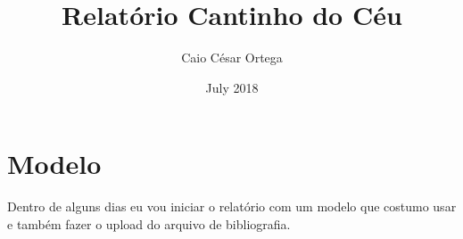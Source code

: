 \documentclass{article}
\title{Relatório Cantinho do Céu}
\author{Caio César Ortega}
\date{July 2018}
\begin{document}
\maketitle

\section{Modelo}

Dentro de alguns dias eu vou iniciar o relatório com um modelo que costumo usar e também fazer o upload do arquivo de bibliografia.
\end{document}
